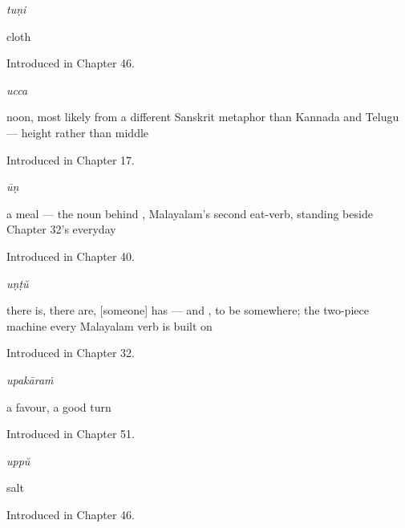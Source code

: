 \noindent\begin{minipage}[t]{\linewidth}
\raggedright
\textbf{}\enspace\emph{tuṇi}\par
\small cloth\par
\footnotesize Introduced in Chapter 46.
\end{minipage}\par\medskip

\noindent\begin{minipage}[t]{\linewidth}
\raggedright
\textbf{}\enspace\emph{ucca}\par
\small noon, most likely from a different Sanskrit metaphor than Kannada and Telugu — height rather than middle\par
\footnotesize Introduced in Chapter 17.
\end{minipage}\par\medskip

\noindent\begin{minipage}[t]{\linewidth}
\raggedright
\textbf{}\enspace\emph{ūṇ}\par
\small a meal — the noun behind , Malayalam's second eat-verb, standing beside Chapter 32's everyday \par
\footnotesize Introduced in Chapter 40.
\end{minipage}\par\medskip

\noindent\begin{minipage}[t]{\linewidth}
\raggedright
\textbf{}\enspace\emph{uṇṭŭ}\par
\small there is, there are, {[}someone{]} has — and , to be somewhere; the two-piece machine every Malayalam verb is built on\par
\footnotesize Introduced in Chapter 32.
\end{minipage}\par\medskip

\noindent\begin{minipage}[t]{\linewidth}
\raggedright
\textbf{}\enspace\emph{upakāraṁ}\par
\small a favour, a good turn\par
\footnotesize Introduced in Chapter 51.
\end{minipage}\par\medskip

\noindent\begin{minipage}[t]{\linewidth}
\raggedright
\textbf{}\enspace\emph{uppŭ}\par
\small salt\par
\footnotesize Introduced in Chapter 46.
\end{minipage}\par\medskip


